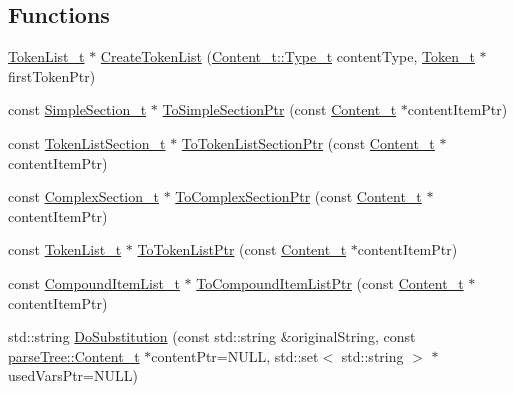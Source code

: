 \subsection*{Functions}
\begin{DoxyCompactItemize}
\item 
\hyperlink{structparse_tree_1_1_token_list__t}{Token\+List\+\_\+t} $\ast$ \hyperlink{namespaceparse_tree_a0963bfb44c05e1a51526921851f6510d}{Create\+Token\+List} (\hyperlink{structparse_tree_1_1_content__t_a45cc4a193beac87a2045a2f6b6870d1b}{Content\+\_\+t\+::\+Type\+\_\+t} content\+Type, \hyperlink{structparse_tree_1_1_token__t}{Token\+\_\+t} $\ast$first\+Token\+Ptr)
\item 
const \hyperlink{structparse_tree_1_1_simple_section__t}{Simple\+Section\+\_\+t} $\ast$ \hyperlink{namespaceparse_tree_aebd61e4868b274451e536881994e723b}{To\+Simple\+Section\+Ptr} (const \hyperlink{structparse_tree_1_1_content__t}{Content\+\_\+t} $\ast$content\+Item\+Ptr)
\item 
const \hyperlink{structparse_tree_1_1_token_list_section__t}{Token\+List\+Section\+\_\+t} $\ast$ \hyperlink{namespaceparse_tree_a0871ea3647e557df3fe1a779d47e579a}{To\+Token\+List\+Section\+Ptr} (const \hyperlink{structparse_tree_1_1_content__t}{Content\+\_\+t} $\ast$content\+Item\+Ptr)
\item 
const \hyperlink{structparse_tree_1_1_complex_section__t}{Complex\+Section\+\_\+t} $\ast$ \hyperlink{namespaceparse_tree_a190e5cd3f3b3240c53c58316186510b7}{To\+Complex\+Section\+Ptr} (const \hyperlink{structparse_tree_1_1_content__t}{Content\+\_\+t} $\ast$content\+Item\+Ptr)
\item 
const \hyperlink{structparse_tree_1_1_token_list__t}{Token\+List\+\_\+t} $\ast$ \hyperlink{namespaceparse_tree_a51a9485e3b99120976837970a1e461f8}{To\+Token\+List\+Ptr} (const \hyperlink{structparse_tree_1_1_content__t}{Content\+\_\+t} $\ast$content\+Item\+Ptr)
\item 
const \hyperlink{structparse_tree_1_1_compound_item_list__t}{Compound\+Item\+List\+\_\+t} $\ast$ \hyperlink{namespaceparse_tree_aaf48a0d53e9cbb87c733bf14be208f43}{To\+Compound\+Item\+List\+Ptr} (const \hyperlink{structparse_tree_1_1_content__t}{Content\+\_\+t} $\ast$content\+Item\+Ptr)
\item 
std\+::string \hyperlink{namespaceparse_tree_a30b566d7dfddf328f3f1c87723c2c693}{Do\+Substitution} (const std\+::string \&original\+String, const \hyperlink{structparse_tree_1_1_content__t}{parse\+Tree\+::\+Content\+\_\+t} $\ast$content\+Ptr=N\+U\+LL, std\+::set$<$ std\+::string $>$ $\ast$used\+Vars\+Ptr=N\+U\+LL)

\end{DoxyCompactItemize}
